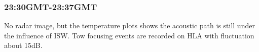 \subsubsection{23:30GMT-23:37GMT}
No radar image, but the temperature plots shows the acoustic path is
still under the influence of ISW. Tow focusing events are recorded
on HLA with fluctuation about 15dB.


